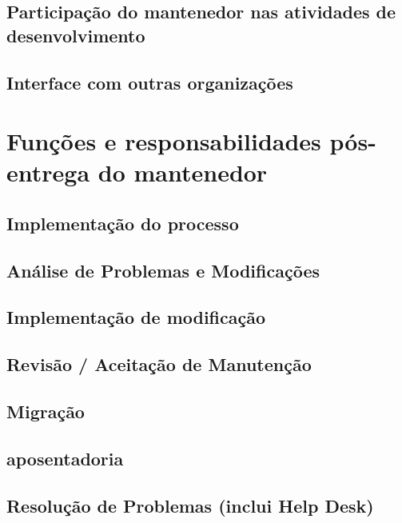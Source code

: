 \subsection{Participação do mantenedor nas atividades de desenvolvimento}

\subsection{Interface com outras organizações}

\section{Funções e responsabilidades pós-entrega do mantenedor}

\subsection{Implementação do processo}

\subsection{Análise de Problemas e Modificações}

\subsection{Implementação de modificação}

\subsection{Revisão / Aceitação de Manutenção}

\subsection{Migração}

\subsection{aposentadoria}

\subsection{Resolução de Problemas (inclui Help Desk)}

